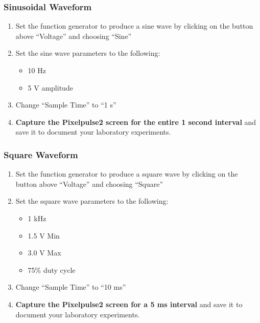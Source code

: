\documentclass[12pt]{../manual}
\begin{document}
\subsubsection{Sinusoidal Waveform}
\begin{enumerate}
\item Set the function generator to produce a sine wave by clicking on the button above ``Voltage'' and choosing ``Sine''
\item Set the sine wave parameters to the following: 
\begin{itemize}
\item 10 Hz
\item 5 V amplitude
\end{itemize}
\item Change ``Sample Time'' to ``1 s''
\item \textbf{Capture the Pixelpulse2 screen for the entire 1 second interval} and save it to document your laboratory experiments.
\end{enumerate}

\subsubsection{Square Waveform}
\begin{enumerate}
\item Set the function generator to produce a square wave by clicking on the button above ``Voltage'' and choosing ``Square''
\item Set the square wave parameters to the following: 
\begin{itemize}
\item 1 kHz
\item 1.5 V Min
\item 3.0 V Max
\item 75\% duty cycle
\end{itemize}
\item Change ``Sample Time'' to ``10 ms''
\item \textbf{Capture the Pixelpulse2 screen for a 5 ms interval} and save it to document your laboratory experiments.
\end{enumerate}
\end{document}
